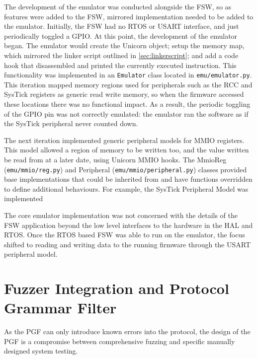 \documentclass[../report.tex]{subfiles}
\begin{document}
The development of the emulator was conducted alongside the FSW, so as features
were added to the FSW, mirrored implementation needed to be added to the
emulator. Initially, the FSW had no RTOS or USART interface, and just
periodically toggled a GPIO. At this point, the development of the emulator
began. The emulator would create the Unicorn object; setup the memory map,
which mirrored the linker script outlined in \autoref{sec:linkerscript}; and
add a code hook that disassembled and printed the currently executed
instruction. This functionality was implemented in an \lstinline|Emulator|
class located in \lstinline|emu/emulator.py|.
This iteration mapped memory regions used for peripherals such as
the RCC and SysTick registers as generic read write memory, so when the
firmware accessed these locations there was no functional impact. As a result,
the periodic toggling of the GPIO pin was not correctly emulated: the emulator
ran the software as if the SysTick peripheral never counted down.

The next iteration implemented generic peripheral models for MMIO registers.
This model allowed a region of memory to be written too, and the value written
be read from at a later date, using Unicorn MMIO hooks. The MmioReg
(\lstinline|emu/mmio/reg.py|) and Peripheral
(\lstinline|emu/mmio/peripheral.py|) classes provided base implementations that
could be inherited from and have functions overridden to define additional
behaviours. For example, the SysTick Peripheral Model was implemented

The core emulator implementation was not concerned with the details of the FSW
application beyond the low level interfaces to the hardware in the HAL and
RTOS. Once the RTOS based FSW was able to run on the emulator, the focus
shifted to reading and writing data to the running firmware through the USART
peripheral model.


\section{Fuzzer Integration and Protocol Grammar Filter}




As the PGF can only introduce known errors into the protocol, the design of the
PGF is a compromise between comprehensive fuzzing and specific manually
designed system testing.
\end{document}
